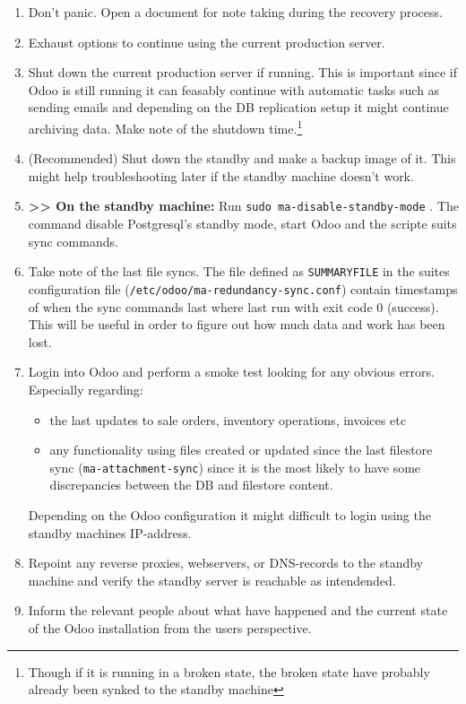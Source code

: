 \documentclass[a4paper]{article}
\begin{document}
	\begin{enumerate}
		\item Don't panic. Open a document for note taking during the recovery process.
		\item Exhaust options to continue using the current production server.
		\item Shut down the current production server if running. This is important since if Odoo is still running it can feasably continue with automatic tasks such as sending emails and depending on the DB replication setup it might continue archiving data. Make note of the shutdown time.\footnote{Though if it is running in a broken state, the broken state have probably already been synked to the standby machine}
		\item (Recommended) Shut down the standby and make a backup image of it. This might help troubleshooting later if the standby machine doesn't work.
		\item \textbf{>> On the standby machine:} Run \texttt{sudo ma-disable-standby-mode} . The command disable Postgresql's standby mode, start Odoo and the scripte suits sync commands.
		\item Take note of the last file syncs. The file defined as \texttt{SUMMARYFILE} in the suites configuration file (\texttt{/etc/odoo/ma-redundancy-sync.conf}) contain timestamps of when the sync commands last where last run with exit code 0 (success). This will be useful in order to figure out how much data and work has been lost.
		\item Login into Odoo and perform a smoke test looking for any obvious errors. Especially regarding:
		\begin{itemize}
			\item the last updates to sale orders, inventory operations, invoices etc
			\item any functionality using files created or updated since the last filestore sync (\texttt{ma-attachment-sync}) since it is the most likely to have some discrepancies between the DB and filestore content.
		\end{itemize}
		Depending on the Odoo configuration it might difficult to login using the standby machines IP-address. 
		\item Repoint any reverse proxies, webservers, or DNS-records to the standby machine and verify the standby server is reachable as intendended.
		\item Inform the relevant people about what have happened and the current state of the Odoo installation from the users perspective.
	\end{enumerate}
	
\end{document}
